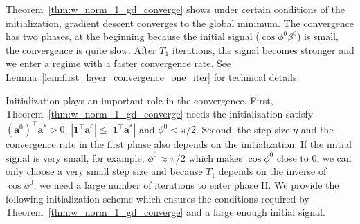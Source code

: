 \documentclass{article}
\newcommand{\secondlayer}{a}
\newcommand{\vect}[1]{\mathbf{#1}}
\newcommand{\abs}[1]{\left|#1\right|}
\begin{document}
Theorem~\ref{thm:w_norm_1_gd_converge} shows under certain conditions of the initialization, gradient descent converges to the global minimum.
The convergence has two phases, at the beginning because the initial signal ($\cos\phi^0 \beta^0$) is small, the convergence is quite slow.
After $T_1$ iterations, the signal becomes stronger and we enter a regime with a faster convergence rate.
See Lemma~\ref{lem:first_layer_convergence_one_iter} for technical details.



Initialization plays an important role in the convergence.
First, Theorem~\ref{thm:w_norm_1_gd_converge} needs the initialization satisfy $\left(\vect{\secondlayer}^0\right)^\top \vect{\secondlayer}^* > 0$, $\abs{ \vect{1}^\top\vect{\secondlayer}^0}\le \abs{\vect{1}^\top \vect{\secondlayer}^*}$ and $\phi^0 <\pi/2$.
Second, the step size $\eta$ and the convergence rate in the first phase also depends on the initialization.
If the initial signal is very small, for example, $\phi^0 \approx \pi/2$ which makes $\cos \phi^0$ close to $0$, we can only choose a very small step size and because $T_1$ depends on the inverse of $\cos \phi^0$, we need a large number of iterations to enter phase II.
We provide the following initialization scheme which ensures the conditions required by Theorem~\ref{thm:w_norm_1_gd_converge} and a large enough initial signal.
\end{document}
